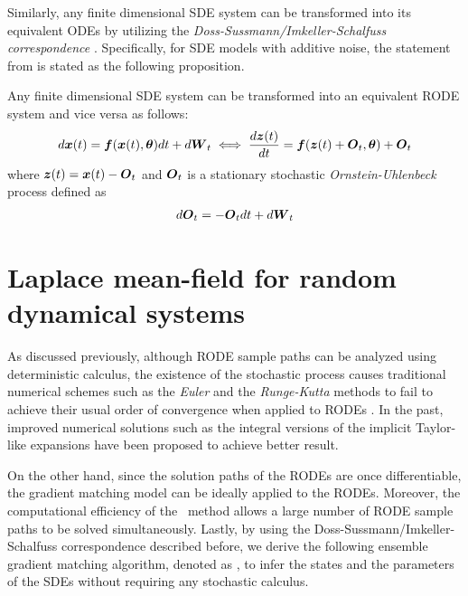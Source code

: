 Similarly, any finite dimensional SDE system can be transformed into its equivalent ODEs by utilizing the \emph{Doss-Sussmann/Imkeller-Schalfuss correspondence} \citep{sussmann1978gap, imkeller2001conjugacy}.
Specifically, for SDE models with additive noise, the statement from \cite[]{jentzen2011taylor} is stated as the following proposition.
\begin{proposition}
    Any finite dimensional SDE system can be transformed into an equivalent RODE system and vice versa as follows:
    \begin{align}
        d\boldsymbol{x}(t) = \boldsymbol{f}(\boldsymbol{x}(t), \boldsymbol{\theta})dt + d\boldsymbol{W}_t 
        \iff 
        \frac{d\boldsymbol{z}(t)}{dt} = \boldsymbol{f}(\boldsymbol{z}(t) + \boldsymbol{O}_t, \boldsymbol{\theta}) + \boldsymbol{O}_t
        \label{eq-rode-sde}
    \end{align}
    where $\boldsymbol{z}(t) = \boldsymbol{x}(t) - \boldsymbol{O}_t$ and $\boldsymbol{O}_t$ is a stationary stochastic \emph{Ornstein-Uhlenbeck} process defined as
    \begin{align}
        d\boldsymbol{O}_t = -\boldsymbol{O}_tdt + d\boldsymbol{W}_t
    \end{align}
\end{proposition}  

\section{Laplace mean-field for random dynamical systems}
\label{sec-rodes-laplace}

As discussed previously, although RODE sample paths can be analyzed using deterministic calculus, the existence of the stochastic process causes traditional numerical schemes such as the \emph{Euler} and the \emph{Runge-Kutta} methods \citep{butcher2016numerical} to fail to achieve their usual order of convergence when applied to RODEs \citep{grune2001pathwise}.
In the past, improved numerical solutions such as the integral versions of the implicit Taylor-like expansions \citep{kloeden2007pathwise} have been proposed to achieve better result.

On the other hand, since the solution paths of the RODEs are once differentiable, the gradient matching model can be ideally applied to the RODEs.
Moreover, the computational efficiency of the \algolpmf\ method allows a large number of RODE sample paths to be solved simultaneously. 
Lastly, by using the Doss-Sussmann/Imkeller-Schalfuss correspondence described before, we derive the following ensemble gradient matching algorithm, denoted as \algolpmfsde, to infer the states and the parameters of the SDEs without requiring any stochastic calculus.

